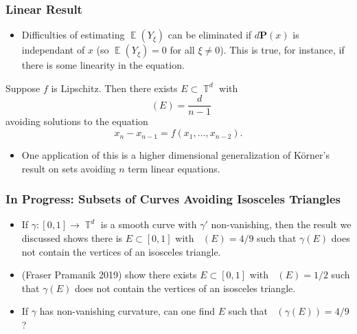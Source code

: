 \documentclass[handout,usenames,dvipsnames]{beamer}
\DeclareMathOperator{\TT}{\mathbb{T}}
\DeclareMathOperator{\EE}{\mathbb{E}}
\DeclareMathOperator{\fordim}{\text{dim}_{\mathbb{F}}}
\DeclareMathOperator{\hausdim}{\text{dim}_{\mathbb{H}}}
\begin{document}
\begin{frame}
    \frametitle{Linear Result}

    \begin{itemize}
        \item Difficulties of estimating $\EE(Y_\xi)$ can be eliminated if $d\mathbf{P}(x)$ is independant of $x$ (so $\EE(Y_\xi) = 0$ for all $\xi \neq 0$). This is true, for instance, if there is some linearity in the equation.
    \end{itemize}

    \begin{theorem}
        Suppose $f$ is Lipschitz. Then there exists $E \subset \TT^d$ with
        \[ \fordim(E) = \frac{d}{n-1} \]
        avoiding solutions to the equation
        \[ x_n - x_{n-1} = f(x_1,\dots,x_{n-2}). \]
    \end{theorem}

    \begin{itemize}
        \item One application of this is a higher dimensional generalization of K\"{o}rner's result on sets avoiding $n$ term linear equations.
    \end{itemize}
\end{frame}

\begin{frame}
    \frametitle{In Progress: Subsets of Curves Avoiding Isosceles Triangles}

    \begin{itemize}
        \item If $\gamma: [0,1] \to \TT^d$ is a smooth curve with $\gamma'$ non-vanishing, then the result we discussed shows there is $E \subset [0,1]$ with $\fordim(E) = 4/9$ such that $\gamma(E)$ does not contain the vertices of an isosceles triangle.

        \item (Fraser Pramanik 2019) show there exists $E \subset [0,1]$ with $\hausdim(E) = 1/2$ such that $\gamma(E)$ does not contain the vertices of an isosceles triangle.

        \item If $\gamma$ has non-vanishing curvature, can one find $E$ such that $\fordim(\gamma(E)) = 4/9$?
    \end{itemize}
\end{frame}
\end{document}
